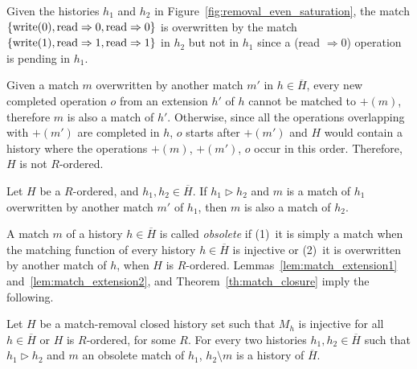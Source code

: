 \begin{example}

  Given the histories $h_1$ and $h_2$ in
  Figure~\ref{fig:removal_even_saturation}, the match ${\{  \textnormal{write}(0),
  \textnormal{read}\Rightarrow 0, \textnormal{read}\Rightarrow0  \}}$ is overwritten by the
  match ${\{  \textnormal{write}(1), \textnormal{read}\Rightarrow 1,
  \textnormal{read}\Rightarrow1  \}}$ in $h_2$ but not in $h_1$ since a (\textnormal{read} $\Rightarrow
  0$) operation is pending in $h_1$.

\end{example}

Given a match $m$ overwritten by another match $m'$ in $h\in \overline{H}$,
every new completed operation $o$ from an extension $h'$ of $h$ cannot be
matched to $+(m)$, therefore $m$ is also a match of $h'$. Otherwise, since all
the operations overlapping with $+(m')$ are completed in $h$, $o$ starts after
$+(m')$ and $H$ would contain a history where the operations $+(m)$, $+(m')$,
$o$ occur in this order. Therefore, $H$ is not $R$-ordered.

\begin{lemma}
  \label{lem:match_extension2}

  Let $H$ be a $R$-ordered, and $h_1, h_2\in \overline{H}$. If $h_1 \vartriangleright h_2$ and
  $m$ is a match of $h_1$ overwritten by another match $m'$ of $h_1$, then $m$
  is also a match of $h_2$.

\end{lemma}

A match $m$ of a history $h\in \overline{H}$ is called \emph{obsolete} if
(1)~it is simply a match when the matching function of every history $h\in
\overline{H}$ is injective or (2)~it is overwritten by another match of $h$,
when $H$ is $R$-ordered. Lemmas~\ref{lem:match_extension1}
and~\ref{lem:match_extension2}, and Theorem~\ref{th:match_closure} imply the
following.

\begin{corollary}
  \label{cor:matching_final}

  Let $H$ be a match-removal closed history set such that $M_h$ is injective
  for all $h\in \overline{H}$ or $H$ is $R$-ordered, for some $R$. For every
  two histories $h_1, h_2\in \overline{H}$ such that $h_1 \vartriangleright
  h_2$ and $m$ an obsolete match of $h_1$, $h_2\setminus m$ is a history of
  $\overline{H}$.

\end{corollary}

